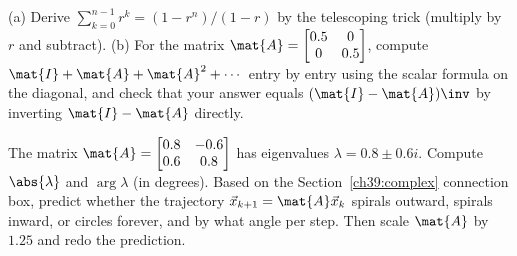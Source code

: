 \begin{exercise}
\label{ch39:ex11}
(a) Derive $\sum_{k=0}^{n-1} r^k = (1-r^n)/(1-r)$ by the telescoping trick (multiply by $r$ and
subtract). (b) For the matrix $\mat{A} = \begin{bmatrix} 0.5 & 0 \\ 0 & 0.5\end{bmatrix}$, compute
$\mat{I} + \mat{A} + \mat{A}^2 + \cdots$ entry by entry using the scalar formula on the diagonal, and
check that your answer equals $(\mat{I} - \mat{A})\inv$ by inverting $\mat{I}-\mat{A}$ directly.
\end{exercise}

\begin{exercise}
\label{ch39:ex12}
The matrix $\mat{A} = \begin{bmatrix} 0.8 & -0.6\\ 0.6 & 0.8\end{bmatrix}$ has eigenvalues $\lambda =
0.8 \pm 0.6 i$. Compute $\abs{\lambda}$ and $\arg\lambda$ (in degrees). Based on the
Section~\ref{ch39:complex} connection box, predict whether the trajectory $\vec{x}_{k+1} =
\mat{A}\vec{x}_k$ spirals outward, spirals inward, or circles forever, and by what angle per step.
Then scale $\mat{A}$ by $1.25$ and redo the prediction.
\end{exercise}
